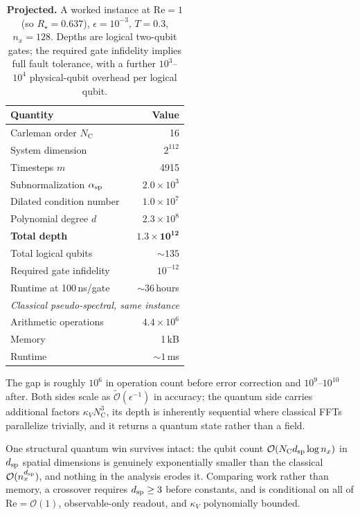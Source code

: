 \documentclass[aps,prx,twocolumn,notitlepage,superscriptaddress,floatfix,10pt]{revtex4-2}
\newcommand{\Rey}{\mathrm{Re}}
\newcommand{\Oh}{\mathcal{O}}
\newcommand{\Ot}{\widetilde{\mathcal{O}}}
\newcommand{\NC}{N_{\mathrm{C}}}
\begin{document}
\begin{table}[t]
\caption{\textbf{Projected.} A worked instance at $\Rey=1$ (so $R_\star=0.637$), $\epsilon=10^{-3}$,
$T=0.3$, $n_x=128$. Depths are logical two-qubit gates; the required gate infidelity implies full
fault tolerance, with a further $10^3$--$10^4$ physical-qubit overhead per logical qubit.}
\label{tab:worked}
\begin{ruledtabular}
\begin{tabular}{lr}
Quantity & Value \\
\hline
Carleman order $\NC$ & 16 \\
System dimension & $2^{112}$ \\
Timesteps $m$ & 4915 \\
Subnormalization $\alpha_{\rm sp}$ & $2.0\times10^{3}$ \\
Dilated condition number & $1.0\times10^{7}$ \\
Polynomial degree $d$ & $2.3\times10^{8}$ \\
\textbf{Total depth} & $\bm{1.3\times10^{12}}$ \\
Total logical qubits & $\sim135$ \\
Required gate infidelity & $10^{-12}$ \\
Runtime at 100\,ns/gate & $\sim36$\,hours \\
\hline
\multicolumn{2}{l}{\emph{Classical pseudo-spectral, same instance}}\\
Arithmetic operations & $4.4\times10^{6}$ \\
Memory & 1\,kB \\
Runtime & $\sim1$\,ms \\
\end{tabular}
\end{ruledtabular}
\end{table}

The gap is roughly $10^6$ in operation count before error correction and $10^9$--$10^{10}$ after. Both
sides scale as $\Ot(\epsilon^{-1})$ in accuracy; the quantum side carries additional factors
$\kappa_V\NC^3$, its depth is inherently sequential where classical FFTs parallelize trivially, and it
returns a quantum state rather than a field.

One structural quantum win survives intact: the qubit count $\Oh(\NC d_{\rm sp}\log n_x)$ in $d_{\rm
sp}$ spatial dimensions is genuinely exponentially smaller than the classical $\Oh(n_x^{d_{\rm sp}})$,
and nothing in the analysis erodes it. Comparing work rather than memory, a crossover requires
$d_{\rm sp}\ge3$ before constants, and is conditional on all of $\Rey=\Oh(1)$, observable-only readout,
and $\kappa_V$ polynomially bounded.
\end{document}
